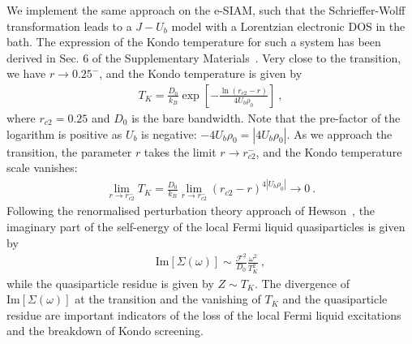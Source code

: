 \documentclass{iopart}
\begin{document}
We implement the same approach on the e-SIAM, such that the Schrieffer-Wolff transformation leads to a \(J-U_b\) model with a Lorentzian electronic DOS in the bath. The expression of the Kondo temperature for such a system has been derived in Sec. 6 of the Supplementary Materials~\cite{supp_mat}. Very close to the transition, we have \(r \to 0.25^{-}\), and the Kondo temperature is given by
\begin{eqnarray}
	T_K = \frac{D_0}{k_B} \exp\left[-\frac{\ln\left( r_{c2} - r \right)}{4 U_b \rho_0}\right]~,
\end{eqnarray}
where \(r_{c2} = 0.25\) and \(D_0\) is the bare bandwidth. Note that the pre-factor of the logarithm is positive as \(U_b\) is negative: \(-4U_b\rho_0 = |4U_b \rho_0|\). As we approach the transition, the parameter \(r\) takes the limit \(r \to r_{c2}^-\), and the Kondo temperature scale vanishes:
\begin{eqnarray}
	\lim_{r \to r_{c2}^-} T_K = \frac{D_0}{k_B} \lim_{r \to r_{c2}^-}\left(r_{c2} - r\right)^{4|U_b\rho_0|} \to 0~.
\end{eqnarray}
Following the renormalised perturbation theory approach of Hewson~\cite{hewson1993,coleman2015}, the imaginary part of the self-energy of the local Fermi liquid quasiparticles is given by
\begin{eqnarray}
	\text{Im}\left[\Sigma(\omega)\right] \sim \frac{\mathcal{F}^2}{D_{0}} \frac{\omega^2}{T_{K}^{2}}~, \label{sigma_rc2}
\end{eqnarray}
while the quasiparticle residue is given by \(Z \sim T_K\). The divergence of \(\text{Im}\left[\Sigma(\omega)\right]\) at the transition and the vanishing of \(T_K\) and the quasiparticle residue are important indicators of the loss of the local Fermi liquid excitations and the breakdown of Kondo screening.
\end{document}
